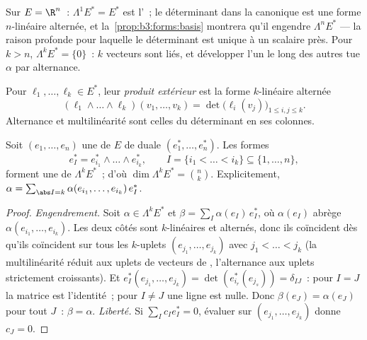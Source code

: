 \begin{example}
Sur $E = \R^n$~: $\Lambda^1E^* = E^*$ est l'~; le
déterminant dans la  canonique est une forme $n$-linéaire
alternée, et la~\cref{prop:b3:forms:basis} montrera qu'il engendre
$\Lambda^nE^*$ --- la raison profonde pour laquelle le
déterminant est unique à un scalaire près. Pour $k > n$,
$\Lambda^kE^* = \{0\}$~: $k$ vecteurs sont liés, et
développer l'un le long des autres tue $\alpha$ par
alternance.
\end{example}

\begin{definition}\label{def:b3:forms:wedge}
Pour $\ell_1, \dots, \ell_k \in E^*$, leur \emph{produit
extérieur} est la forme $k$-linéaire
alternée
\[
(\ell_1 \wedge \dots \wedge \ell_k)(v_1, \dots, v_k)
= \det\bigl(\ell_i(v_j)\bigr)_{1 \leq i, j \leq k} .
\]
Alternance et multilinéarité sont celles du déterminant en
ses colonnes.
\end{definition}

\begin{proposition}\label{prop:b3:forms:basis}
Soit $(e_1, \dots, e_n)$ une  de $E$ de  duale
$(e_1^*, \dots, e_n^*)$. Les formes
\[
e_I^* = e_{i_1}^* \wedge \dots \wedge e_{i_k}^*,
\qquad I = \{i_1 < \dots < i_k\} \subseteq \{1, \dots, n\},
\]
forment une  de $\Lambda^kE^*$~; d'où $\dim\Lambda^kE^* =
\binom nk$. Explicitement, $\alpha =
\sum_{\abs I = k}\alpha(e_{i_1}, \dots, e_{i_k})\,e_I^*$.
\end{proposition}

\begin{proof}
\emph{Engendrement.} Soit $\alpha \in \Lambda^kE^*$ et $\beta
= \sum_I\alpha(e_I)\,e_I^*$, où $\alpha(e_I)$ abrège
$\alpha(e_{i_1}, \dots, e_{i_k})$. Les deux côtés sont
$k$-linéaires et alternés, donc ils coïncident dès qu'ils
coïncident sur tous les $k$-uplets $(e_{j_1}, \dots,
e_{j_k})$ avec $j_1 < \dots < j_k$ (la multilinéarité réduit
aux uplets de vecteurs de , l'alternance aux uplets
strictement croissants). Et $e_I^*(e_{j_1}, \dots, e_{j_k})
= \det(e_{i_r}^*(e_{j_s})) = \delta_{IJ}$~: pour $I = J$ la
matrice est l'identité~; pour $I \neq J$ une ligne est nulle.
Donc $\beta(e_J) = \alpha(e_J)$ pour tout $J$~: $\beta =
\alpha$. \emph{Liberté.} Si $\sum_I c_Ie_I^* = 0$, évaluer
sur $(e_{j_1}, \dots, e_{j_k})$ donne $c_J = 0$.
\end{proof}

